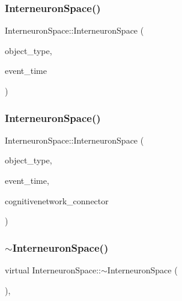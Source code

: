 \subsubsection{\texorpdfstring{Interneuron\+Space()}{InterneuronSpace()}\hspace{0.1cm}{\footnotesize\ttfamily [3/4]}}
{\footnotesize\ttfamily Interneuron\+Space\+::\+Interneuron\+Space (\begin{DoxyParamCaption}\item[{unsigned int}]{object\+\_\+type,  }\item[{std\+::chrono\+::time\+\_\+point$<$ \mbox{\hyperlink{universe_8h_a0ef8d951d1ca5ab3cfaf7ab4c7a6fd80}{Clock}} $>$}]{event\+\_\+time }\end{DoxyParamCaption})\hspace{0.3cm}{\ttfamily [inline]}}

\mbox{\label{classInterneuronSpace_aa87eb8c7186542989fccdadc594c5915}} 
\subsubsection{\texorpdfstring{Interneuron\+Space()}{InterneuronSpace()}\hspace{0.1cm}{\footnotesize\ttfamily [4/4]}}
{\footnotesize\ttfamily Interneuron\+Space\+::\+Interneuron\+Space (\begin{DoxyParamCaption}\item[{unsigned int}]{object\+\_\+type,  }\item[{std\+::chrono\+::time\+\_\+point$<$ \mbox{\hyperlink{universe_8h_a0ef8d951d1ca5ab3cfaf7ab4c7a6fd80}{Clock}} $>$}]{event\+\_\+time,  }\item[{\mbox{\hyperlink{classCognitiveNetwork}{Cognitive\+Network}} \&}]{cognitivenetwork\+\_\+connector }\end{DoxyParamCaption})\hspace{0.3cm}{\ttfamily [inline]}}

\mbox{\label{classInterneuronSpace_aff0056e3c60b7eff3ad4ca12f6756628}} 
\subsubsection{\texorpdfstring{$\sim$\+Interneuron\+Space()}{~InterneuronSpace()}}
{\footnotesize\ttfamily virtual Interneuron\+Space\+::$\sim$\+Interneuron\+Space (\begin{DoxyParamCaption}{ }\end{DoxyParamCaption})\hspace{0.3cm}{\ttfamily [inline]}, {\ttfamily [virtual]}}

